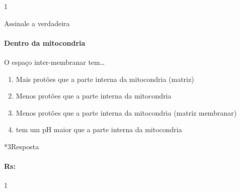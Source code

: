 \documentclass[\mainfilename]{subfiles}
\begin{document}
\begin{questionBox}1{}
    
    Assinale a verdadeira
    \paragraph{Dentro da mitocondria}
    O espaço inter-membranar tem\dots

    \begin{enumerate}
        \item Mais protões que a parte interna da mitocondria (matriz)
        \item Menos protões que a parte interna da mitocondria
        \item Menos protões que a parte interna da mitocondria (matriz membranar)
        \item tem um pH maior que a parte interna da mitocondria
    \end{enumerate}

    \begin{questionBox}*3{Resposta}
        
        \paragraph{Rs:} 1
        
    \end{questionBox}

\end{questionBox}
\end{document}
